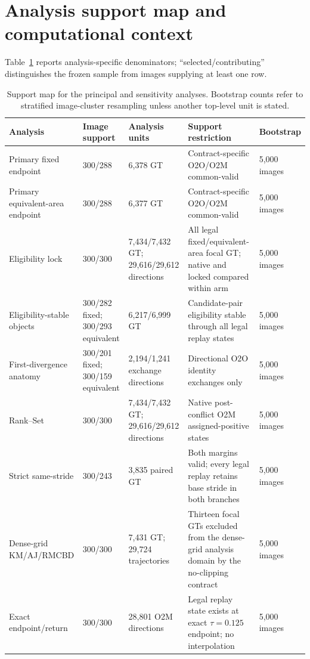 \documentclass[preprint,10pt]{elsarticle}
\begin{document}
\section{Analysis support map and computational context}

Table~\ref{tab:support_map} reports analysis-specific denominators; ``selected/contributing'' distinguishes the frozen sample from images supplying at least one row.

\begin{table}[p]
\centering
\scriptsize
\caption{Support map for the principal and sensitivity analyses. Bootstrap counts refer to stratified image-cluster resampling unless another top-level unit is stated.}
\label{tab:support_map}
\begin{tabularx}{\textwidth}{@{}p{}p{}p{}Xp{}@{}}
\toprule
Analysis & Image support & Analysis units & Support restriction & Bootstrap \\
\midrule
Primary fixed endpoint & 300/288 & 6,378 GT & Contract-specific O2O/O2M common-valid & 5,000 images \\
Primary equivalent-area endpoint & 300/288 & 6,377 GT & Contract-specific O2O/O2M common-valid & 5,000 images \\
Eligibility lock & 300/300 & 7,434/7,432 GT; 29,616/29,612 directions & All legal fixed/equivalent-area focal GT; native and locked compared within arm & 5,000 images \\
Eligibility-stable objects & 300/282 fixed; 300/293 equivalent & 6,217/6,999 GT & Candidate-pair eligibility stable through all legal replay states & 5,000 images \\
First-divergence anatomy & 300/201 fixed; 300/159 equivalent & 2,194/1,241 exchange directions & Directional O2O identity exchanges only & 5,000 images \\
Rank--Set & 300/300 & 7,434/7,432 GT; 29,616/29,612 directions & Native post-conflict O2M assigned-positive states & 5,000 images \\
Strict same-stride & 300/243 & 3,835 paired GT & Both margins valid; every legal replay retains base stride in both branches & 5,000 images \\
Dense-grid KM/AJ/RMCBD & 300/300 & 7,431 GT; 29,724 trajectories & Thirteen focal GTs excluded from the dense-grid analysis domain by the no-clipping contract & 5,000 images \\
Exact endpoint/return & 300/300 & 28,801 O2M directions & Legal replay state exists at exact $\tau=0.125$ endpoint; no interpolation & 5,000 images \\

\end{tabularx}
\end{table}
\end{document}
